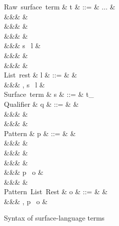 \begin{figure}[H]
\begin{syntaxfig}
\mbox{Raw surface term}
&
t
&
::=
&
...
&
\\
&&&
&
\\
&&&
&
\\
&&&
\sExNil
&
\\
&&&
\kw{\lbrack}s \ l
&
\\
&&&
&
\\
&&&
&
\\[2mm]

\mbox{List rest}
&
l
&
::=
&
\rbrack
&
\\
&&&
, s \ l
&
\\[2mm]

\mbox{Surface term}
&
s
&
::=
&
t_{\alpha}
\\[2mm]


\mbox{Qualifier}
&
q
&
::=
&
&
\\
&&&
&
\\
&&&
&
\\[2mm]


\mbox{Pattern}
&
p
&
::=
&
&
\\
&&&
\pattNil
&
\\
&&&
&
\\
&&&
\pattSNil
&
\\
&&&
\lbrack p \ o
&
\\
&&&
&
\\[2mm]

\mbox{Pattern List Rest}
&
o
&
::=
&
\rbrack
&
\\
&&&
, p \ o
&
\\[2mm]
\end{syntaxfig}
\caption{Syntax of surface-language terms}
\end{figure}



